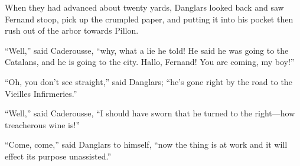 When they had advanced about twenty yards, Danglars looked back and saw
Fernand stoop, pick up the crumpled paper, and putting it into his
pocket then rush out of the arbor towards Pillon.

“Well,” said Caderousse, “why, what a lie he told! He said he was going
to the Catalans, and he is going to the city. Hallo, Fernand! You are
coming, my boy!”

“Oh, you don’t see straight,” said Danglars; “he’s gone right by the
road to the Vieilles Infirmeries.”

“Well,” said Caderousse, “I should have sworn that he turned to the
right—how treacherous wine is!”

“Come, come,” said Danglars to himself, “now the thing is at work and
it will effect its purpose unassisted.”

